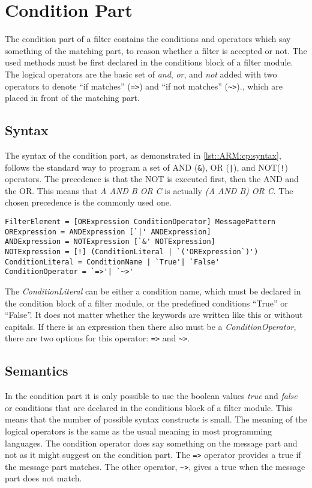 \chapter{Condition Part} \label{chapter:conditionpart}
The condition part of a filter contains the conditions and operators which say something of the matching part, to reason whether a filter is accepted or not. 
The used methods must be first declared in the conditions block of a filter module. The logical operators are the basic set of \emph{and}, \emph{or}, and \emph{not} added with
two operators to denote ``if matches'' (\lstinline[language=Composestar]|=>|) and ``if not matches'' (\lstinline[language=Composestar]|~>|)., which are placed in front of the matching part.

\section*{Syntax}
The syntax of the condition part, as demonstrated in \autoref{lst::ARM:cp:syntax}, follows the standard way to
program a set of AND (\lstinline|&|), OR (\lstinline$|$), and NOT(\lstinline|!|) operators. The precedence is that the NOT is executed first, then the AND and the OR. This means
that \emph{A AND B OR C} is actually \emph{(A AND B) OR C}. The chosen precedence is the commonly used one.

\begin{lstlisting}[caption={Filter condition part syntax},label=lst::ARM:cp:syntax,style=listing,language=ebnf,float=tpb]
FilterElement = [ORExpression ConditionOperator] MessagePattern
ORExpression = ANDExpression [`|' ANDExpression]
ANDExpression = NOTExpression [`&' NOTExpression]
NOTExpression = [!] (ConditionLiteral | `('ORExpression`)')
ConditionLiteral = ConditionName | `True'| `False'
ConditionOperator = `=>'| `~>'
\end{lstlisting}

The \emph{ConditionLiteral} can be either a condition name, which must be declared in the condition block of a filter module,
or the predefined conditions ``True'' or ``False''. It does not matter whether the keywords are written like this or without
capitals. If there is an expression then there also must be a \emph{ConditionOperator}, there are two options for this
operator: \lstinline[language=Composestar]|=>| and \lstinline[language=Composestar]|~>|.

\section*{Semantics}
In the condition part it is only possible to use the boolean values \emph{true} and \emph{false} or conditions that are declared in the conditions block of a filter module.
This means that the number of possible syntax constructs is small.
The meaning of the logical operators is the same as the usual meaning in most programming languages. The condition operator
does say something on the message part and not as it might suggest on the condition part. The \lstinline|=>| operator
provides a true if the message part matches. The other operator, \lstinline[language=Composestar]|~>|,
gives a true when the message part does not match.

